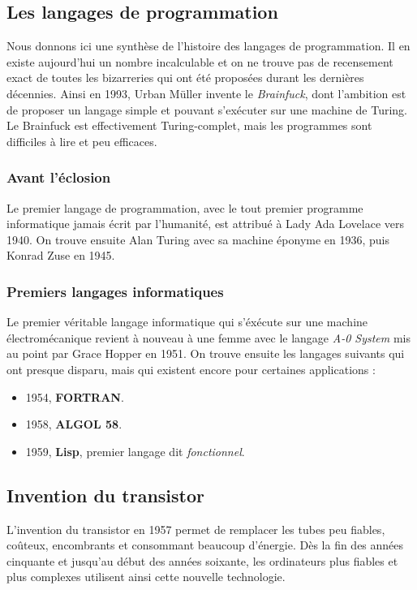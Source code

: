 \documentclass[a4paper,11pt]{book}
\begin{document}
\subsection{Les langages de programmation}
Nous donnons ici une synthèse de l'histoire des langages de programmation. Il en existe aujourd'hui un nombre incalculable et on ne trouve pas de recensement exact de toutes les bizarreries qui ont été proposées durant les dernières décennies. Ainsi en 1993, Urban Müller invente le \textit{Brainfuck}, dont l'ambition est de proposer un langage simple et pouvant s'exécuter sur une machine de Turing. Le Brainfuck est effectivement Turing-complet, mais les programmes sont difficiles à lire et peu efficaces.

\subsubsection{Avant l'éclosion}
Le premier langage de programmation, avec le tout premier programme informatique jamais écrit par l'humanité, est attribué à Lady Ada Lovelace vers 1940. On trouve ensuite Alan Turing avec sa machine éponyme en 1936, puis Konrad Zuse en 1945.
\subsubsection{Premiers langages informatiques}
Le premier véritable langage informatique qui s'éxécute sur une machine électromécanique revient à nouveau à une femme avec le langage \textit{A-0 System} mis au point par Grace Hopper en 1951.
On trouve ensuite les langages suivants qui ont presque disparu, mais qui existent encore pour certaines applications :
\begin{itemize}
    \item 1954, \textbf{FORTRAN}.
    \item 1958, \textbf{ALGOL 58}.
    \item 1959, \textbf{Lisp}, premier langage dit \textit{fonctionnel}.
\end{itemize}

\subsection{Invention du transistor}
L'invention du transistor en 1957 permet de remplacer les tubes peu fiables, coûteux, encombrants et consommant beaucoup d'énergie. Dès la fin des années cinquante et jusqu'au début des années soixante, les ordinateurs plus fiables et plus complexes utilisent ainsi cette nouvelle technologie.
\end{document}
